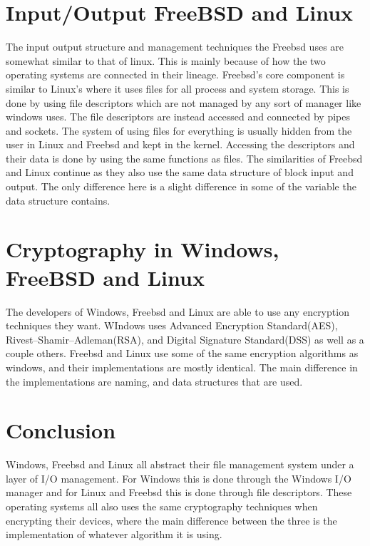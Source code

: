 \documentclass[onecolumn, draftclsnofoot, 10pt, titlepage, compsoc]{IEEEtran}
\begin{document}
\section{Input/Output FreeBSD and Linux}
The input output structure and management techniques the Freebsd uses are somewhat similar to that of linux. This is mainly because of how the two operating systems are connected in their lineage. Freebsd’s core component is similar to Linux’s where it uses files for all process and system storage. This is done by using file descriptors which are not managed by any sort of manager like windows uses. The file descriptors are instead accessed and connected by pipes and sockets. The system of using files for everything is usually hidden from the user in Linux and Freebsd and kept in the kernel. Accessing the descriptors and their data is done by using the same functions as files. The similarities of Freebsd and Linux continue as they also use the same data structure of block input and output. The only difference here is a slight difference in some of the variable the data structure contains.

\section{Cryptography in Windows, FreeBSD and Linux}
The developers of Windows, Freebsd and Linux are able to use any encryption techniques they want. WIndows uses Advanced Encryption Standard(AES), Rivest–Shamir–Adleman(RSA), and Digital Signature Standard(DSS) as well as a couple others. Freebsd and Linux use some of the same encryption algorithms as windows, and their implementations are mostly identical. The main difference in the implementations are naming, and data structures that are used.
\section{Conclusion}
Windows, Freebsd and Linux all abstract their file management system under a layer of I/O management. For Windows this is done through the Windows I/O manager and for Linux and Freebsd this is done through file descriptors. These operating systems all also uses the same cryptography techniques when encrypting their devices, where the main difference between the three is the implementation of whatever algorithm it is using.
\nocite{*}


\end{document}
